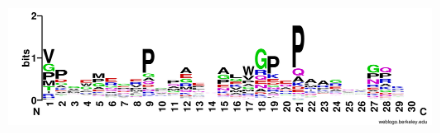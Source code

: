 

\begin{figure}[htbp]
\includegraphics[width=\textwidth]{img/resultados/logo.png}
\caption{}
\label{fig:logo}
\end{figure}